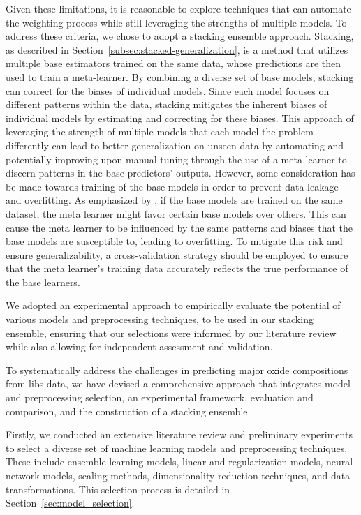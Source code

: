 Given these limitations, it is reasonable to explore techniques that can automate the weighting process while still leveraging the strengths of multiple models.
To address these criteria, we chose to adopt a stacking ensemble approach. 
Stacking, as described in Section~\ref{subsec:stacked-generalization}, is a method that utilizes multiple base estimators trained on the same data, whose predictions are then used to train a meta-learner.
By combining a diverse set of base models, stacking can correct for the biases of individual models.
Since each model focuses on different patterns within the data, stacking mitigates the inherent biases of individual models by estimating and correcting for these biases.
This approach of leveraging the strength of multiple models that each model the problem differently can lead to better generalization on unseen data by automating and potentially improving upon manual tuning through the use of a meta-learner to discern patterns in the base predictors' outputs. \cite{wolpertstacked_1992} \cite{survey_of_ensemble_learning}
However, some consideration has be made towards training of the base models in order to prevent data leakage and overfitting.
As emphasized by \citet{cvstacking}, if the base models are trained on the same dataset, the meta learner might favor certain base models over others.
This can cause the meta learner to be influenced by the same patterns and biases that the base models are susceptible to, leading to overfitting.
To mitigate this risk and ensure generalizability, a cross-validation strategy should be employed to ensure that the meta learner's training data accurately reflects the true performance of the base learners.

We adopted an experimental approach to empirically evaluate the potential of various models and preprocessing techniques, to be used in our stacking ensemble, ensuring that our selections were informed by our literature review while also allowing for independent assessment and validation.

To systematically address the challenges in predicting major oxide compositions from \gls{libs} data, we have devised a comprehensive approach that integrates model and preprocessing selection, an experimental framework, evaluation and comparison, and the construction of a stacking ensemble.

Firstly, we conducted an extensive literature review and preliminary experiments to select a diverse set of machine learning models and preprocessing techniques.
These include ensemble learning models, linear and regularization models, neural network models, scaling methods, dimensionality reduction techniques, and data transformations.
This selection process is detailed in Section~\ref{sec:model_selection}.

